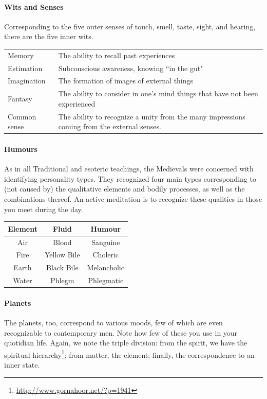\paragraph{Wits and Senses}
Corresponding to the five outer senses of touch, smell, taste, sight, and hearing, there are the five inner wits.

\begin{table}[h]\small\centering
\begin{tabular}{lp{}}\toprule
Memory &
The ability to recall past experiences\\
Estimation &
Subconscious awareness, knowing ``in the gut"\\
Imagination &
The formation of images of external things\\
Fantasy &
The ability to consider in one's mind things that have not been experienced\\
Common sense &
The ability to recognize a unity from the many impressions coming from the external senses.\\\bottomrule
\end{tabular}
\end{table}
\paragraph{Humours}
As in all Traditional and esoteric teachings, the Medievals were concerned with identifying personality types. They recognized four main types corresponding to (not caused by) the qualitative elements and bodily processes, as well as the combinations thereof. An active meditation is to recognize these qualities in those you meet during the day.

\begin{table}[h]\small\centering
\begin{tabular}{ccc}\toprule
\textbf{Element} &
\textbf{Fluid} &
\textbf{Humour}\\\midrule
Air &
Blood &
Sanguine\\
Fire &
Yellow Bile &
Choleric\\
Earth &
Black Bile &
Melancholic\\
Water &
Phlegm &
Phlegmatic\\\bottomrule
\end{tabular}
\end{table}
\paragraph{Planets}
The planets, too, correspond to various moods, few of which are even recognizable to contemporary men. Note how few of these you use in your quotidian life. Again, we note the triple division: from the spirit, we have the spiritual hierarchy\footnote{\url{http://www.gornahoor.net/?p=1941}}; from matter, the element; finally, the correspondence to an inner state.

